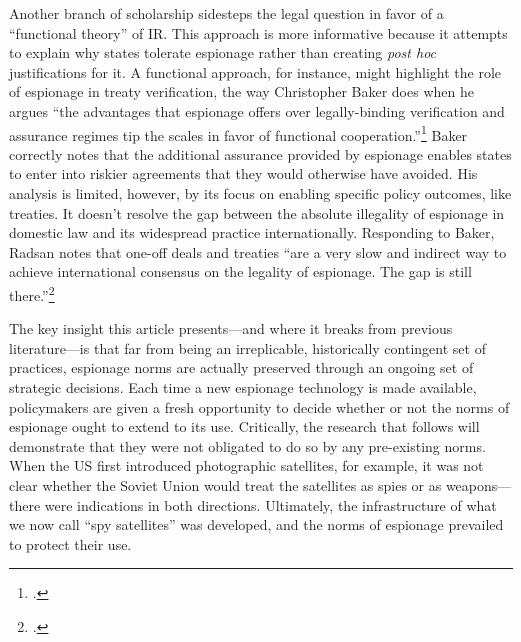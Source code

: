 \documentclass[14pt]{extarticle}
\begin{document}
Another branch of scholarship sidesteps the legal question in favor of a \enquote{functional theory} of IR. This approach is more informative because it attempts to explain why states tolerate espionage rather than creating \emph{post hoc} justifications for it. A functional approach, for instance, might highlight the role of espionage in treaty verification, the way Christopher Baker does when he argues \enquote{the advantages that espionage offers over legally-binding verification and assurance regimes tip the scales in favor of functional cooperation.}\footcite{baker_tolerance_2004} Baker correctly notes that the additional assurance provided by espionage enables states to enter into riskier agreements that they would otherwise have avoided. His analysis is limited, however, by its focus on enabling specific policy outcomes, like treaties. It doesn't resolve the gap between the absolute illegality of espionage in domestic law and its widespread practice internationally. Responding to Baker, Radsan notes that one-off deals and treaties \enquote{are a very slow and indirect way to achieve international consensus on the legality of espionage. The gap is still there.}\footcite[p.~607]{radsan_unresolved_2007}


The key insight this article presents---and where it breaks from previous literature---is that far from being an irreplicable, historically contingent set of practices, espionage norms are actually preserved through an ongoing set of strategic decisions. Each time a new espionage technology is made available, policymakers are given a fresh opportunity to decide whether or not the norms of espionage ought to extend to its use. Critically, the research that follows will demonstrate that they were not obligated to do so by any pre-existing norms. When the US first introduced photographic satellites, for example, it was not clear whether the Soviet Union would treat the satellites as spies or as weapons---there were indications in both directions. Ultimately, the infrastructure of what we now call \enquote{spy satellites} was developed, and the norms of espionage prevailed to protect their use.
\end{document}
